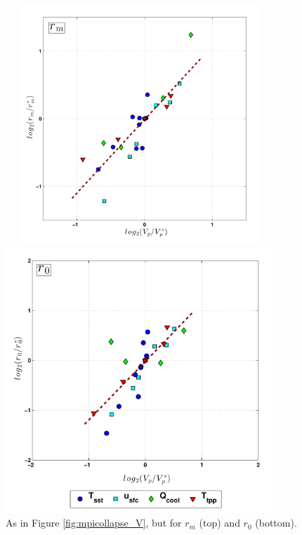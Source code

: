 \documentclass[12pt]{article}
\begin{document}
\begin{figure}[h!]
\centering
  \noindent\includegraphics[width=10cm,height=9cm]{FIGURES_TC_RCE_equilibrium_v2.0/Fig4a_MPI_collapse_rm.pdf}
  
  \noindent\includegraphics[width=10cm,height=10cm]{FIGURES_TC_RCE_equilibrium_v2.0/Fig4b_MPI_collapse_r0.pdf}
\caption{As in Figure \ref{fig:mpicollapse_V}, but for $r_m$ (top) and $r_{0}$ (bottom).}
\label{fig:mpicollapse_r}
\end{figure}
\end{document}
